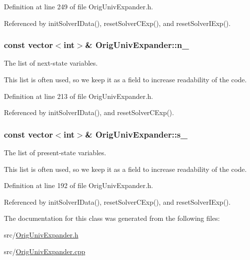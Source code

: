Definition at line 249 of file Orig\-Univ\-Expander.\-h.



Referenced by init\-Solver\-I\-Data(), reset\-Solver\-C\-Exp(), and reset\-Solver\-I\-Exp().

\hypertarget{classOrigUnivExpander_aee21f9c6dab80e323bf9d17172fa9dc2}{
\subsubsection[{n\-\_\-}]{\setlength{\rightskip}{0pt plus 5cm}const vector$<$int$>$\& Orig\-Univ\-Expander\-::n\-\_\-\hspace{0.3cm}{\ttfamily [protected]}}}\label{classOrigUnivExpander_aee21f9c6dab80e323bf9d17172fa9dc2}


The list of next-\/state variables. 

This list is often used, so we keep it as a field to increase readability of the code. 

Definition at line 213 of file Orig\-Univ\-Expander.\-h.



Referenced by init\-Solver\-I\-Data(), and reset\-Solver\-C\-Exp().

\hypertarget{classOrigUnivExpander_a3e52a15c675f3f9dfedfb0b083ed12c4}{
\subsubsection[{s\-\_\-}]{\setlength{\rightskip}{0pt plus 5cm}const vector$<$int$>$\& Orig\-Univ\-Expander\-::s\-\_\-\hspace{0.3cm}{\ttfamily [protected]}}}\label{classOrigUnivExpander_a3e52a15c675f3f9dfedfb0b083ed12c4}


The list of present-\/state variables. 

This list is often used, so we keep it as a field to increase readability of the code. 

Definition at line 192 of file Orig\-Univ\-Expander.\-h.



Referenced by init\-Solver\-I\-Data(), reset\-Solver\-C\-Exp(), and reset\-Solver\-I\-Exp().



The documentation for this class was generated from the following files\-:\begin{DoxyCompactItemize}
\item 
src/\hyperlink{OrigUnivExpander_8h}{Orig\-Univ\-Expander.\-h}\item 
src/\hyperlink{OrigUnivExpander_8cpp}{Orig\-Univ\-Expander.\-cpp}\end{DoxyCompactItemize}
